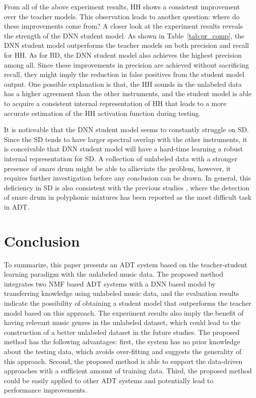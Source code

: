 \documentclass{article}
\begin{document}
From all of the above experiment results, HH shows a consistent improvement over the teacher models. This observation leads to another question: where do these improvements come from? A closer look at the experiment results reveals the strength of the DNN student model. As shown in Table~\ref{tab:pr_comp}, the DNN student model outperforms the teacher models on both precision and recall for HH. As for BD, the DNN student model also achieves the highest precision among all. Since these improvements in precision are achieved without sacrificing recall, they might imply the reduction in false positives from the student model output. One possible explanation is that, the HH sounds in the unlabeled data has a higher agreement than the other instruments, and the student model is able to acquire a consistent internal representation of HH that leads to a more accurate estimation of the HH activation function during testing.

It is noticeable that the DNN student model seems to constantly struggle on SD. Since the SD tends to have larger spectral overlap with the other instruments, it is conceivable that DNN student model will have a hard-time learning a robust internal representation for SD. A collection of unlabeled data with a stronger presence of snare drum might be able to allieviate the problem, however, it requires further investigation before any conclusion can be drawn. In general, this deficiency in SD is also consistent with the previous studies \cite{Paulus2009a, Wu2015a, Southall2016, Vogl2016}, where the detection of snare drum in polyphonic mixtures has been reported as the most difficult task in ADT. 

\section{Conclusion}\label{sec:conclusion}
To summarize, this paper presents an ADT system based on the teacher-student learning paradigm with the unlabeled music data. The proposed method integrates two NMF based ADT systems with a DNN based model by transferring knowledge using unlabeled music data, and the evaluation results indicate the possibility of obtaining a student model that outperforms the teacher model based on this approach. The experiment results also imply the benefit of having relevant music genres in the unlabeled dataset, which could lead to the construction of a better unlabeled dataset in the future studies. The proposed method has the following advantages: first, the system has no prior knowledge about the testing data, which avoids over-fitting and suggests the generality of this approach. Second, the proposed method is able to support the data-driven approaches with a sufficient amount of training data. Third, the proposed method could be easily applied to other ADT systems and potentially lead to performance improvements.
\end{document}
